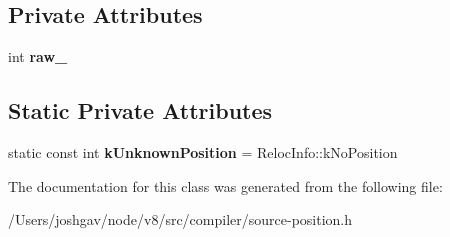 \subsection*{Private Attributes}
\begin{DoxyCompactItemize}
\item 
int {\bfseries raw\+\_\+}\hypertarget{classv8_1_1internal_1_1compiler_1_1_source_position_a2286e265036ea6de0771626bc1e7ccc0}{}\label{classv8_1_1internal_1_1compiler_1_1_source_position_a2286e265036ea6de0771626bc1e7ccc0}

\end{DoxyCompactItemize}
\subsection*{Static Private Attributes}
\begin{DoxyCompactItemize}
\item 
static const int {\bfseries k\+Unknown\+Position} = Reloc\+Info\+::k\+No\+Position\hypertarget{classv8_1_1internal_1_1compiler_1_1_source_position_a4f7a6186d399cbd6caf633bb060e38ab}{}\label{classv8_1_1internal_1_1compiler_1_1_source_position_a4f7a6186d399cbd6caf633bb060e38ab}

\end{DoxyCompactItemize}


The documentation for this class was generated from the following file\+:\begin{DoxyCompactItemize}
\item 
/\+Users/joshgav/node/v8/src/compiler/source-\/position.\+h\end{DoxyCompactItemize}
